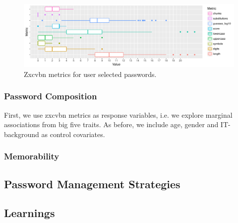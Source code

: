 \begin{figure}[tbph]
	\centering
	\includegraphics[width=1\linewidth]{figures/personality/study3-metrics-overview}
	\caption{\label{fig:personality:study3:metrics-overview} Zxcvbn metrics for user selected passwords.}
\end{figure}

\subsubsection{Password Composition}
First, we use zxcvbn metrics as response variables, i.e. we explore marginal associations from big five traits. As before, we include age, gender and IT-background as control covariates. 

\subsubsection{Memorability}


\subsection{Password Management Strategies}

\subsection{Learnings}